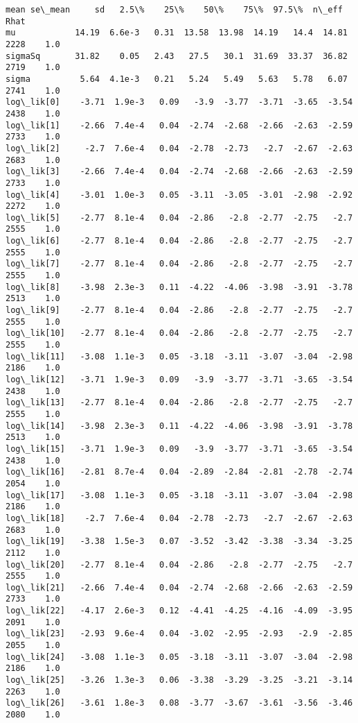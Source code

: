 \documentclass[11pt]{article}
\begin{document}
\begin{Verbatim}[commandchars=\\\{\}]
               mean se\_mean     sd   2.5\%    25\%    50\%    75\%  97.5\%  n\_eff   Rhat
mu            14.19  6.6e-3   0.31  13.58  13.98  14.19   14.4  14.81   2228    1.0
sigmaSq       31.82    0.05   2.43   27.5   30.1  31.69  33.37  36.82   2719    1.0
sigma          5.64  4.1e-3   0.21   5.24   5.49   5.63   5.78   6.07   2741    1.0
log\_lik[0]    -3.71  1.9e-3   0.09   -3.9  -3.77  -3.71  -3.65  -3.54   2438    1.0
log\_lik[1]    -2.66  7.4e-4   0.04  -2.74  -2.68  -2.66  -2.63  -2.59   2733    1.0
log\_lik[2]     -2.7  7.6e-4   0.04  -2.78  -2.73   -2.7  -2.67  -2.63   2683    1.0
log\_lik[3]    -2.66  7.4e-4   0.04  -2.74  -2.68  -2.66  -2.63  -2.59   2733    1.0
log\_lik[4]    -3.01  1.0e-3   0.05  -3.11  -3.05  -3.01  -2.98  -2.92   2272    1.0
log\_lik[5]    -2.77  8.1e-4   0.04  -2.86   -2.8  -2.77  -2.75   -2.7   2555    1.0
log\_lik[6]    -2.77  8.1e-4   0.04  -2.86   -2.8  -2.77  -2.75   -2.7   2555    1.0
log\_lik[7]    -2.77  8.1e-4   0.04  -2.86   -2.8  -2.77  -2.75   -2.7   2555    1.0
log\_lik[8]    -3.98  2.3e-3   0.11  -4.22  -4.06  -3.98  -3.91  -3.78   2513    1.0
log\_lik[9]    -2.77  8.1e-4   0.04  -2.86   -2.8  -2.77  -2.75   -2.7   2555    1.0
log\_lik[10]   -2.77  8.1e-4   0.04  -2.86   -2.8  -2.77  -2.75   -2.7   2555    1.0
log\_lik[11]   -3.08  1.1e-3   0.05  -3.18  -3.11  -3.07  -3.04  -2.98   2186    1.0
log\_lik[12]   -3.71  1.9e-3   0.09   -3.9  -3.77  -3.71  -3.65  -3.54   2438    1.0
log\_lik[13]   -2.77  8.1e-4   0.04  -2.86   -2.8  -2.77  -2.75   -2.7   2555    1.0
log\_lik[14]   -3.98  2.3e-3   0.11  -4.22  -4.06  -3.98  -3.91  -3.78   2513    1.0
log\_lik[15]   -3.71  1.9e-3   0.09   -3.9  -3.77  -3.71  -3.65  -3.54   2438    1.0
log\_lik[16]   -2.81  8.7e-4   0.04  -2.89  -2.84  -2.81  -2.78  -2.74   2054    1.0
log\_lik[17]   -3.08  1.1e-3   0.05  -3.18  -3.11  -3.07  -3.04  -2.98   2186    1.0
log\_lik[18]    -2.7  7.6e-4   0.04  -2.78  -2.73   -2.7  -2.67  -2.63   2683    1.0
log\_lik[19]   -3.38  1.5e-3   0.07  -3.52  -3.42  -3.38  -3.34  -3.25   2112    1.0
log\_lik[20]   -2.77  8.1e-4   0.04  -2.86   -2.8  -2.77  -2.75   -2.7   2555    1.0
log\_lik[21]   -2.66  7.4e-4   0.04  -2.74  -2.68  -2.66  -2.63  -2.59   2733    1.0
log\_lik[22]   -4.17  2.6e-3   0.12  -4.41  -4.25  -4.16  -4.09  -3.95   2091    1.0
log\_lik[23]   -2.93  9.6e-4   0.04  -3.02  -2.95  -2.93   -2.9  -2.85   2055    1.0
log\_lik[24]   -3.08  1.1e-3   0.05  -3.18  -3.11  -3.07  -3.04  -2.98   2186    1.0
log\_lik[25]   -3.26  1.3e-3   0.06  -3.38  -3.29  -3.25  -3.21  -3.14   2263    1.0
log\_lik[26]   -3.61  1.8e-3   0.08  -3.77  -3.67  -3.61  -3.56  -3.46   2080    1.0

\end{Verbatim}
\end{document}
